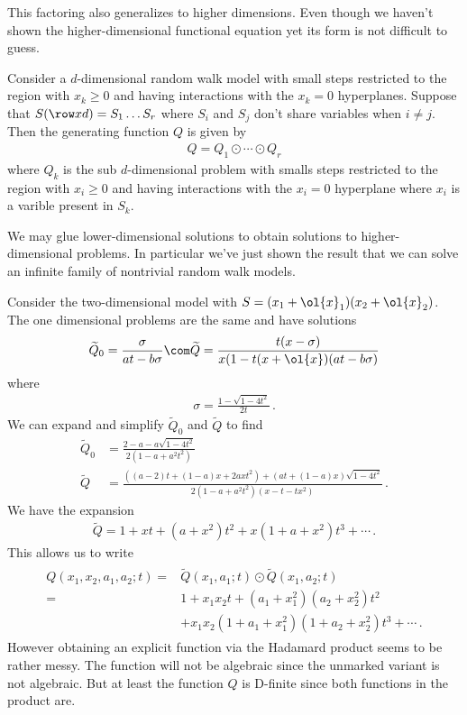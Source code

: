 This factoring also generalizes to higher dimensions. Even though we haven't shown the higher-dimensional functional equation yet its form is not difficult to guess.
\begin{theorem} Consider a $d$-dimensional random walk model with small steps restricted to the region with $x_k \ge 0$ and having interactions with the $x_k = 0$ hyperplanes. Suppose that $S(\row xd) = S_1\ldots S_r$ where $S_i$ and $S_j$ don't share variables when $i\neq j$. Then the generating function $Q$ is given by
\begin{align}
	Q = Q_1 \odot \cdots \odot Q_r
\end{align}
where $Q_k$ is the sub $d$-dimensional problem with smalls steps restricted to the region with $x_i \ge 0$ and having interactions with the $x_i = 0$ hyperplane where $x_i$ is a varible present in $S_k$.
\end{theorem}

We may glue lower-dimensional solutions to obtain solutions to higher-dimensional problems. In particular we've just shown the result that we can solve an infinite family of nontrivial random walk models.

\begin{example} Consider the two-dimensional model with $S = (x_1+\ol{x}_1)(x_2+\ol{x}_2)$. The one dimensional problems are the same and have solutions
\begin{align}
	\widetilde{Q}_0 = \frac{\sigma}{at-b\sigma}\com \widetilde{Q} = \frac{t(x-\sigma)}{x(1-t(x+\ol{x})(at-b\sigma)}
\end{align}
where
\begin{align}
	\sigma = \frac{1-\sqrt{1-4t^2}}{2t}\,.
\end{align}
We can expand and simplify $\widetilde{Q}_0$ and $\widetilde{Q}$ to find
\begin{align}
	\widetilde{Q}_0 &= \frac{2-a-a\sqrt{1-4t^2}}{2(1-a+a^2t^2)}\,\\
	\widetilde{Q} &= \frac{((a-2)t+(1-a)x+2axt^2)+(at+(1-a)x)\sqrt{1-4t^2}}{2(1-a+a^2t^2)(x-t-tx^2)}\,.
\end{align}
We have the expansion
\begin{align}
	\widetilde{Q} = 1 + xt + (a+x^2)t^2+x(1+a+x^2)t^3 + \cdots\,.
\end{align}
This allows us to write
\begin{align}
\begin{split}
	Q(x_1,x_2,a_1,a_2;t) =& \widetilde{Q}(x_1,a_1;t) \odot \widetilde{Q}(x_1,a_2;t)\\
		=&1 + x_1x_2t + (a_1+x_1^2)(a_2+x_2^2)t^2\\
		&+x_1x_2(1+a_1+x_1^2)(1+a_2+x_2^2)t^3 + \cdots\,.
\end{split}
\end{align}
However obtaining an explicit function via the Hadamard product seems to be rather messy. The function will not be algebraic since the unmarked variant is not algebraic. But at least the function $Q$ is D-finite since both functions in the product are.
\end{example}

